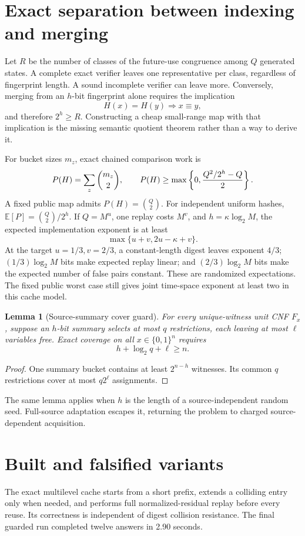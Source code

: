 \documentclass[11pt]{article}
\newtheorem{lemma}{Lemma}
\begin{document}
\section{Exact separation between indexing and merging}
Let $R$ be the number of classes of the future-use congruence among $Q$
generated states.  A complete exact verifier leaves one representative per
class, regardless of fingerprint length.  A sound incomplete verifier can
leave more.  Conversely, merging from an $h$-bit fingerprint alone requires
the implication
\[
 H(x)=H(y)\Longrightarrow x\equiv y,
\]
and therefore $2^h\ge R$.  Constructing a cheap small-range map with that
implication is the missing semantic quotient theorem rather than a way to
derive it.

For bucket sizes $m_z$, exact chained comparison work is
\[
 P(H)=\sum_z\binom{m_z}{2},
\qquad
 P(H)\ge\max\left\{0,{Q^2/2^h-Q\over2}\right\}.
\]
A fixed public map admits $P(H)=\binom Q2$.  For independent uniform hashes,
$\mathbb E[P]=\binom Q2/2^h$.  If $Q=M^u$, one replay costs $M^v$, and
$h=\kappa\log_2M$, the expected implementation exponent is at least
\[
 \max\{u+v,2u-\kappa+v\}.
\]
At the target $u=1/3,v=2/3$, a constant-length digest leaves exponent $4/3$;
$(1/3)\log_2M$ bits make expected replay linear; and
$(2/3)\log_2M$ bits make the expected number of false pairs constant.  These
are randomized expectations.  The fixed public worst case still gives joint
time-space exponent at least two in this cache model.

\begin{lemma}[Source-summary cover guard]
For every unique-witness unit CNF $F_x$, suppose an $h$-bit summary selects at
most $q$ restrictions, each leaving at most $\ell$ variables free.  Exact
coverage on all $x\in\{0,1\}^n$ requires
\[
 h+\log_2q+\ell\ge n.
\]
\end{lemma}
\begin{proof}
One summary bucket contains at least $2^{n-h}$ witnesses.  Its common $q$
restrictions cover at most $q2^\ell$ assignments.
\end{proof}
The same lemma applies when $h$ is the length of a source-independent random
seed.  Full-source adaptation escapes it, returning the problem to charged
source-dependent acquisition.

\section{Built and falsified variants}
The exact multilevel cache starts from a short prefix, extends a colliding
entry only when needed, and performs full normalized-residual replay before
every reuse.  Its correctness is independent of digest collision resistance.
The final guarded run completed twelve answers in 2.90 seconds.
\end{document}
